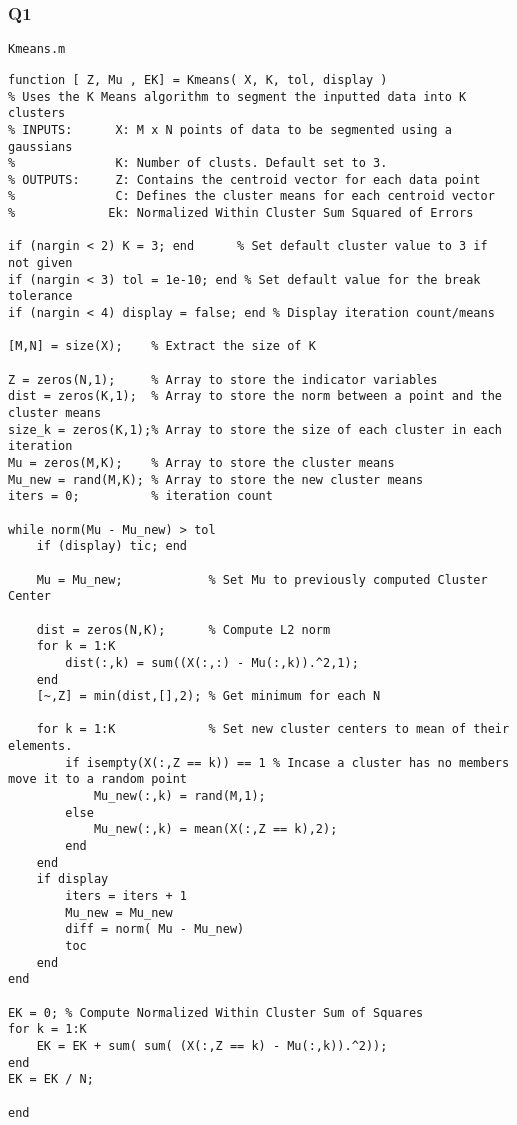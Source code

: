 \documentclass{article}
\begin{document}
\subsubsection{Q1}



\texttt{Kmeans.m}
\begin{lstlisting}
function [ Z, Mu , EK] = Kmeans( X, K, tol, display )
% Uses the K Means algorithm to segment the inputted data into K clusters
% INPUTS:      X: M x N points of data to be segmented using a gaussians
%              K: Number of clusts. Default set to 3.
% OUTPUTS:     Z: Contains the centroid vector for each data point
%              C: Defines the cluster means for each centroid vector
%             Ek: Normalized Within Cluster Sum Squared of Errors

if (nargin < 2) K = 3; end      % Set default cluster value to 3 if not given
if (nargin < 3) tol = 1e-10; end % Set default value for the break tolerance
if (nargin < 4) display = false; end % Display iteration count/means

[M,N] = size(X);    % Extract the size of K

Z = zeros(N,1);     % Array to store the indicator variables
dist = zeros(K,1);  % Array to store the norm between a point and the cluster means
size_k = zeros(K,1);% Array to store the size of each cluster in each iteration
Mu = zeros(M,K);    % Array to store the cluster means
Mu_new = rand(M,K); % Array to store the new cluster means
iters = 0;          % iteration count

while norm(Mu - Mu_new) > tol
    if (display) tic; end

    Mu = Mu_new;            % Set Mu to previously computed Cluster Center

    dist = zeros(N,K);      % Compute L2 norm
    for k = 1:K
        dist(:,k) = sum((X(:,:) - Mu(:,k)).^2,1);
    end
    [~,Z] = min(dist,[],2); % Get minimum for each N
    
    for k = 1:K             % Set new cluster centers to mean of their elements.
        if isempty(X(:,Z == k)) == 1 % Incase a cluster has no members move it to a random point
            Mu_new(:,k) = rand(M,1);
        else
            Mu_new(:,k) = mean(X(:,Z == k),2);
        end
    end
    if display
        iters = iters + 1
        Mu_new = Mu_new
        diff = norm( Mu - Mu_new)
        toc
    end
end

EK = 0; % Compute Normalized Within Cluster Sum of Squares
for k = 1:K
    EK = EK + sum( sum( (X(:,Z == k) - Mu(:,k)).^2));
end
EK = EK / N;

end
\end{lstlisting}
\end{document}
